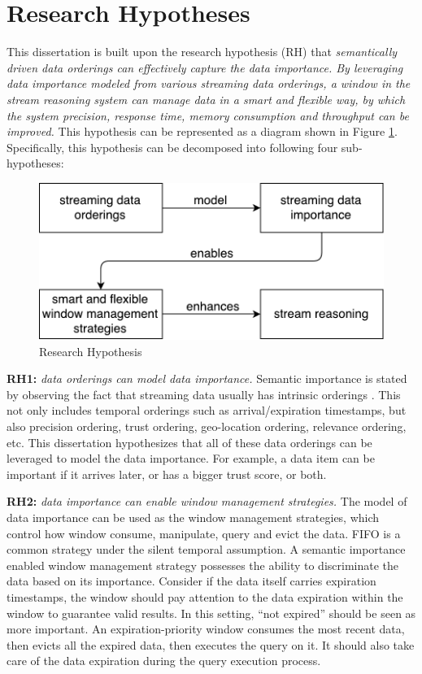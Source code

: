 \section{Research Hypotheses}
This dissertation is built upon the research hypothesis (RH) that \textit{semantically driven data orderings can effectively capture the data importance. By leveraging data importance modeled from various streaming data orderings, a window in the stream reasoning system can manage data in a smart and flexible way, by which the system precision, response time, memory consumption and throughput can be improved.}
This hypothesis can be represented as a diagram shown in Figure \ref{fig:1-rh}.
Specifically, this hypothesis can be decomposed into following four sub-hypotheses:

\begin{figure}[!htbp]
	\centering
	\includegraphics[width=5in]{img/1-rh.pdf}
	\caption{Research Hypothesis}
	\label{fig:1-rh} 
\end{figure}

\textbf{RH1:} \textit{data orderings can model data importance.}
Semantic importance is stated by observing the fact that streaming data usually has intrinsic orderings \cite{della2013order}. 
This not only includes temporal orderings such as arrival/expiration timestamps, but also precision ordering, trust ordering, geo-location ordering, relevance ordering, etc. 
This dissertation hypothesizes that all of these data orderings can be leveraged to model the data importance. 
For example, a data item can be important if it arrives later, or has a bigger trust score, or both. 

\textbf{RH2:} \textit{data importance can enable window management strategies.}
The model of data importance can be used as the window management strategies, which control how window consume, manipulate, query and evict the data.
FIFO is a common strategy under the silent temporal assumption. 
A semantic importance enabled window management strategy possesses the ability to discriminate the data based on its importance. 
Consider if the data itself carries expiration timestamps, the window should pay attention to the data expiration within the window to guarantee valid results.
In this setting, ``not expired'' should be seen as more important. 
An expiration-priority window consumes the most recent data, then evicts all the expired data, then executes the query on it. 
It should also take care of the data expiration during the query execution process. 

